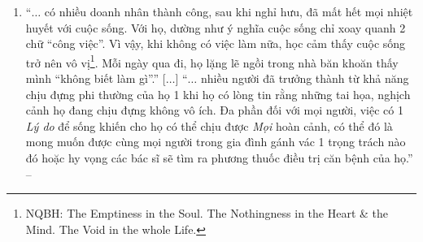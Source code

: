 \documentclass[oneside]{book}
\numberwithin{equation}{section}
\begin{document}
\begin{enumerate}[leftmargin=0mm]
	``Frankl would have argued that we are never left with nothing as long as we retain\footnote{\textbf{retain} [v] \textbf{1.} \textbf{retain somebody\texttt{/}something} to keep somebody\texttt{/}something; to continue to have something \& not lose it or get rid of it; \textbf{2.} \textbf{retain something}to take in a substance \& keep holding it; \textbf{3.} \textbf{retain something} to remember or continue to hold something; \textbf{4.} \textbf{retain somebody\texttt{/}something} (\textit{law}) to employ a professional person such as a lawyer or doctor; to make regular payments to such a person in order to keep their services.} the freedom to choose how we will respond.'' -- \cite[Preface by \textsc{Harold S. Kushner}, p. 10]{Frankl2013}
	\item ``$\ldots$ có nhiều doanh nhân thành công, sau khi nghỉ hưu, đã mất hết mọi nhiệt huyết với cuộc sống. Với họ, dường như ý nghĩa cuộc sống chỉ xoay quanh 2 chữ ``công việc''. Vì vậy, khi không có việc làm nữa, học cảm thấy cuộc sống trở nên vô vị\footnote{NQBH: The Emptiness in the Soul. The Nothingness in the Heart \& the Mind. The Void in the whole Life.}. Mỗi ngày qua đi, họ lặng lẽ ngồi trong nhà băn khoăn thấy mình ``không biết làm gì''.'' [$\ldots$] ``$\ldots$ nhiều người đã trưởng thành từ khả năng chịu đựng phi thường của họ 1 khi họ có lòng tin rằng những tai họa, nghịch cảnh họ đang chịu đựng không vô ích. Đa phần đối với mọi người, việc có 1 \textit{Lý do} để sống khiến cho họ có thể chịu được \textit{Mọi} hoàn cảnh, có thể đó là mong muốn được cùng mọi người trong gia đình gánh vác 1 trọng trách nào đó hoặc hy vọng các bác sĩ sẽ tìm ra phương thuốc điều trị căn bệnh của họ.'' -- \cite[p. 8]{Frankl2022}
	

\end{enumerate}
\end{document}
